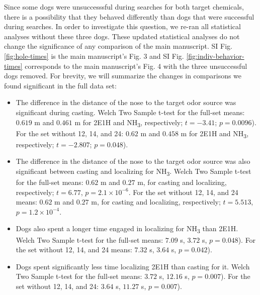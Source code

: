 \documentclass[
]{article}
\providecommand{\tightlist}{%
  \setlength{\itemsep}{0pt}\setlength{\parskip}{0pt}}
\begin{document}
Since some dogs were unsuccesssful during searches for both target chemicals, there is a possibility that they behaved differently than dogs that were successful during searches. In order to investigate this question, we re-ran all statistical analyses without these three dogs.
These updated statistical analyses do not change the significance of any comparison of the main manuscript. SI Fig. \ref{fig:hole-times} is the main manuscript's Fig. 3 and SI Fig. \ref{fig:indiv-behavior-times} corresponds to the main manuscript's Fig. 4 with the three unsuccessful dogs removed. For brevity, we will summarize the changes in comparisons we found significant in the full data set:

\begin{itemize}
\tightlist
\item
  The difference in the distance of the nose to the target odor source was significant during casting. Welch Two Sample t-test for the full-set means: \(0.619\) m and \(0.461\) m for 2E1H and NH\textsubscript{3}, respectively; \(t = -3.41\); \(p = 0.0096\)). For the set without 12, 14, and 24: \(0.62\) m and \(0.458\) m for 2E1H and NH\textsubscript{3}, respectively; \(t = -2.807\); \(p = 0.048\)).
\item
  The difference in the distance of the nose to the target odor source was also significant between casting and localizing for NH\textsubscript{3}. Welch Two Sample t-test for the full-set means: \(0.62\) m and \(0.27\) m, for casting and localizing, respectively; \(t = 6.77\), \(p = \ensuremath{2.1\times 10^{-6}}\). For the set without 12, 14, and 24 means: \(0.62\) m and \(0.27\) m, for casting and localizing, respectively; \(t = 5.513\), \(p = \ensuremath{1.2\times 10^{-4}}\).
\item
  Dogs also spent a longer time engaged in localizing for NH\textsubscript{3} than 2E1H. Welch Two Sample t-test for the full-set means: \(7.09\) s, \(3.72\) s, \(p = 0.048\)). For the set without 12, 14, and 24 means: \(7.32\) s, \(3.64\) s, \(p = 0.042\)).
\item
  Dogs spent significantly less time localizing 2E1H than casting for it. Welch Two Sample t-test for the full-set means: \(3.72\) s, \(12.16\) s, \(p = 0.007\)). For the set without 12, 14, and 24: \(3.64\) s, \(11.27\) s, \(p = 0.007\)).
\end{itemize}
\end{document}
